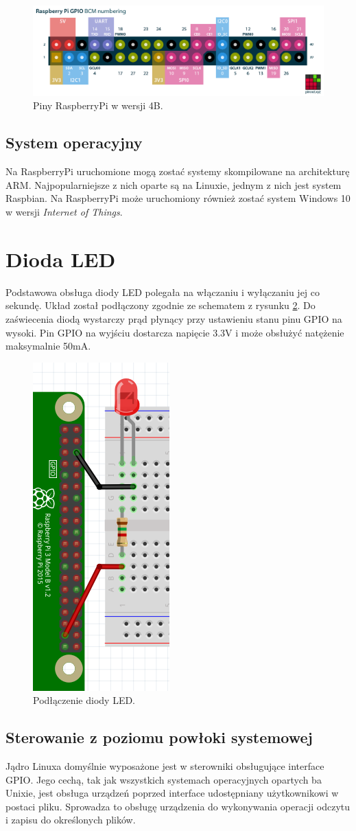 \documentclass[12pt]{article}
\begin{document}
\begin{figure}[h]
  \centering
  \includegraphics[width=\linewidth]{raspberry-pi-pinout}
  \caption{Piny RaspberryPi w wersji 4B\cite{pinout}.}
  \label{raspi:2}
\end{figure}

\subsection{System operacyjny}
Na RaspberryPi uruchomione mogą zostać systemy skompilowane na architekturę ARM. Najpopularniejsze z nich oparte są na Linuxie, jednym z nich jest system Raspbian\cite{raspbian}. Na RaspberryPi może uruchomiony również zostać system Windows 10 w wersji \textit{Internet of Things}\cite{w10iot}.
\newpage
\section{Dioda LED}
Podstawowa obsługa diody LED polegała na włączaniu i wyłączaniu jej co sekundę. Układ został podłączony zgodnie ze schematem z rysunku \ref{sch:1}. Do zaświecenia diodą wystarczy prąd płynący przy ustawieniu stanu pinu GPIO na wysoki. Pin GPIO na wyjściu dostarcza napięcie 3.3V i może obsłużyć natężenie maksymalnie 50mA\cite{raspi:power}.

\begin{figure}[h]
  \centering
  \includegraphics[height=0.4\linewidth]{sch1}
  \caption{Podłączenie diody LED.}
  \label{sch:1}
\end{figure}

\subsection{Sterowanie z poziomu powłoki systemowej}
Jądro Linuxa domyślnie wyposażone jest w sterowniki obsługujące interface GPIO. Jego cechą, tak jak wszystkich systemach operacyjnych opartych ba Unixie, jest obsługa urządzeń poprzed interface udostępniany użytkownikowi w postaci pliku. Sprowadza to obsługę urządzenia do wykonywania operacji odczytu i zapisu do określonych plików.
\end{document}

